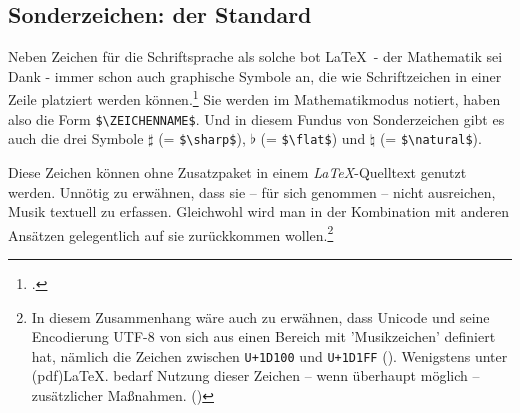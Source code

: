 %
%
%



\subsection{Sonderzeichen: der Standard}

Neben Zeichen für die Schriftsprache als solche bot \LaTeX\ - der
Mathematik sei Dank - immer schon auch graphische Symbole an, die wie
Schriftzeichen in einer Zeile platziert werden können.\footcite[vgl.][543ff et
passim]{MitGoo2005a} Sie werden im Mathematikmodus notiert, haben also die Form
\texttt{\small \$\textbackslash{ZEICHENNAME}\$}. Und in diesem Fundus von Sonderzeichen
gibt es auch die drei Symbole $\sharp$ (= \texttt{\small \$\textbackslash{sharp}\$}),
$\flat$ (= \texttt{\small \$\textbackslash{flat}\$}) und $\natural$ (=
\texttt{\small \$\textbackslash{natural}\$}).

Diese Zeichen können ohne Zusatzpaket in einem \textit{LaTeX}-Quelltext genutzt
werden. Unnötig zu erwähnen, dass sie -- für sich genommen -- nicht ausreichen,
Musik textuell zu erfassen. Gleichwohl wird man in der Kombination mit anderen
Ansätzen gelegentlich auf sie zurückkommen wollen.\footnote{In diesem
Zusammenhang wäre auch zu erwähnen, dass Unicode und seine Encodierung UTF-8 von
sich aus einen Bereich mit 'Musikzeichen' definiert hat, nämlich die Zeichen
zwischen \texttt{U+1D100} und \texttt{U+1D1FF} (\cite[Vgl. dazu][\nopage
wp.]{Koellerwirth2015a}). Wenigstens unter (pdf)\LaTeX. bedarf Nutzung dieser
Zeichen -- wenn überhaupt möglich -- zusätzlicher Maßnahmen. (\cite[Zum
Zusammenhang zwischen Unicode und UTF( vgl.][\nopage wp.]{Kuhn2019a})}

%
